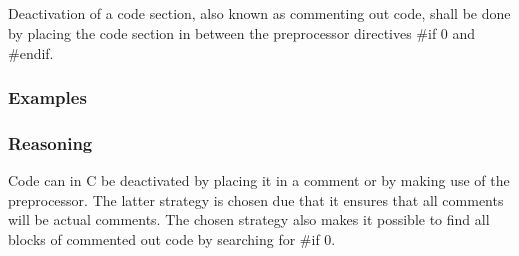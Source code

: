 \subsection*{\codingRule{}}

Deactivation of a code section, also known as commenting out code, shall be done by placing the code section in between the preprocessor directives \#if 0 and \#endif.

\subsubsection*{Examples}

\noindent
\begin{minipage}[t]{\codelstwidth\linewidth}
    
\end{minipage}
\hfill
\begin{minipage}[t]{\codelstwidth\linewidth}
    
\end{minipage}

\subsubsection*{Reasoning}

Code can in C be deactivated by placing it in a comment or by making use of the preprocessor. The latter strategy is chosen due that it ensures that all comments will be actual comments. The chosen strategy also makes it possible to find all blocks of commented out code by searching for \#if 0.